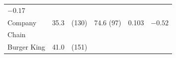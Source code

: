 \documentclass[11pt,a4paper,openany]{book}
\begin{document}
\begin{longtable}[]{@{}lrrrcc@{}}
\begin{minipage}[t]{0.08\columnwidth}
\(-0.17\)\strut
\end{minipage}\tabularnewline
\begin{minipage}[t]{0.26\columnwidth}\raggedright\strut
Company\strut
\end{minipage} & \begin{minipage}[t]{0.04\columnwidth}\raggedleft\strut
35.3\strut
\end{minipage} & \begin{minipage}[t]{0.05\columnwidth}\raggedleft\strut
(130)\strut
\end{minipage} & \begin{minipage}[t]{0.29\columnwidth}\raggedleft\strut
74.6 (97)\strut
\end{minipage} & \begin{minipage}[t]{0.10\columnwidth}\centering\strut
0.103\strut
\end{minipage} & \begin{minipage}[t]{0.08\columnwidth}\centering\strut
\(-0.52\)\strut
\end{minipage}\tabularnewline
\begin{minipage}[t]{0.26\columnwidth}\raggedright\strut
Chain\strut
\end{minipage} & \begin{minipage}[t]{0.04\columnwidth}\raggedleft\strut
\strut
\end{minipage} & \begin{minipage}[t]{0.05\columnwidth}\raggedleft\strut
\strut
\end{minipage} & \begin{minipage}[t]{0.29\columnwidth}\raggedleft\strut
\strut
\end{minipage} & \begin{minipage}[t]{0.10\columnwidth}\centering\strut
\strut
\end{minipage} & \begin{minipage}[t]{0.08\columnwidth}\centering\strut
\strut
\end{minipage}\tabularnewline
\begin{minipage}[t]{0.26\columnwidth}\raggedright\strut
Burger King\strut
\end{minipage} & \begin{minipage}[t]{0.04\columnwidth}\raggedleft\strut
41.0\strut
\end{minipage} & \begin{minipage}[t]{0.05\columnwidth}\raggedleft\strut
(151)\strut
\end{minipage} & \begin{minipage}[t]{0.29\columnwidth}\raggedleft\strut

\end{minipage}
\end{longtable}
\end{document}
